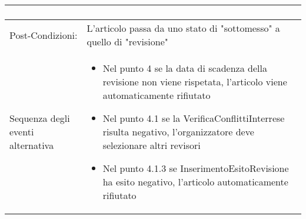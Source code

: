 \begin{tabular}{|p{3cm}|p{7cm}|}
\begin{enumerate}
                   \end{enumerate}\\
\hline
Post-Condizioni: &L'articolo passa da uno stato di "sottomesso" a quello di "revisione" \\
\hline
Sequenza degli eventi alternativa & \begin{itemize}
\item Nel punto 4 se la data di scadenza della revisione non viene rispetata, l'articolo viene automaticamente rifiutato
\item Nel punto 4.1 se la VerificaConflittiInterrese risulta negativo, l'organizzatore deve selezionare altri revisori
\item Nel punto 4.1.3 se InserimentoEsitoRevisione ha esito negativo, l'articolo automaticamente rifiutato
\end{itemize}\\
\hline
\end{tabular}\\

